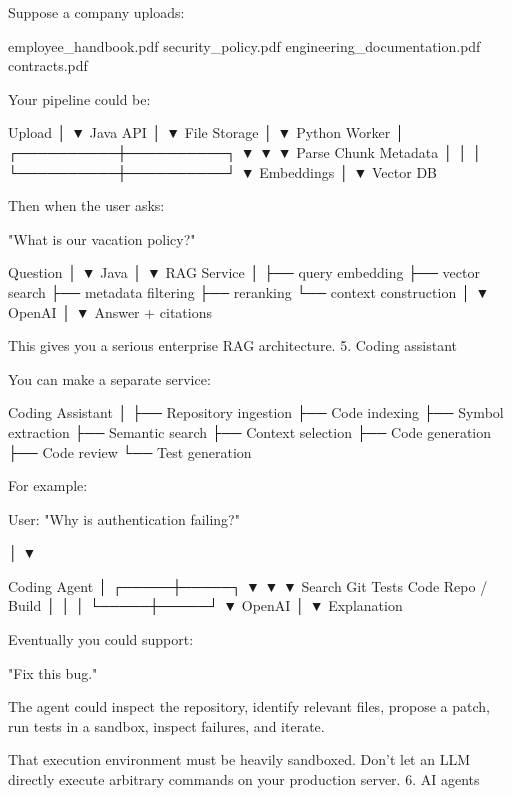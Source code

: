 Suppose a company uploads:

employee_handbook.pdf
security_policy.pdf
engineering_documentation.pdf
contracts.pdf

Your pipeline could be:

                 Upload
                   │
                   ▼
              Java API
                   │
                   ▼
              File Storage
                   │
                   ▼
             Python Worker
                   │
        ┌──────────┼──────────┐
        ▼          ▼          ▼
     Parse       Chunk      Metadata
        │          │          │
        └──────────┼──────────┘
                   ▼
              Embeddings
                   │
                   ▼
              Vector DB

Then when the user asks:

    "What is our vacation policy?"

Question
   │
   ▼
Java
   │
   ▼
RAG Service
   │
   ├── query embedding
   ├── vector search
   ├── metadata filtering
   ├── reranking
   └── context construction
   │
   ▼
OpenAI
   │
   ▼
Answer + citations

This gives you a serious enterprise RAG architecture.
5. Coding assistant

You can make a separate service:

Coding Assistant
       │
       ├── Repository ingestion
       ├── Code indexing
       ├── Symbol extraction
       ├── Semantic search
       ├── Context selection
       ├── Code generation
       ├── Code review
       └── Test generation

For example:

User:
"Why is authentication failing?"

             │
             ▼

       Coding Agent
             │
       ┌─────┼─────┐
       ▼     ▼     ▼
    Search  Git   Tests
     Code   Repo  / Build
       │     │     │
       └─────┼─────┘
             ▼
           OpenAI
             │
             ▼
        Explanation

Eventually you could support:

    "Fix this bug."

The agent could inspect the repository, identify relevant files, propose a patch, run tests in a sandbox, inspect failures, and iterate.

That execution environment must be heavily sandboxed. Don't let an LLM directly execute arbitrary commands on your production server.
6. AI agents

